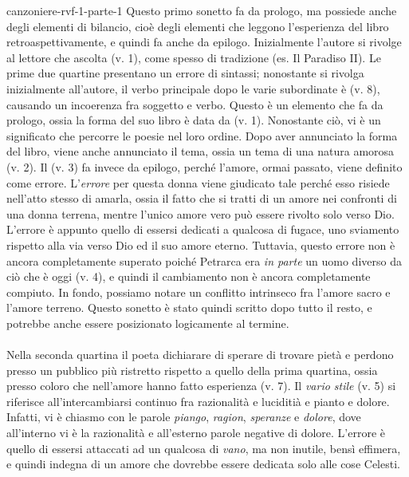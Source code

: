 \documentclass[preview]{standalone}
\begin{document}
\begin{snippet}{canzoniere-rvf-1-parte-1}
    Questo primo sonetto fa da prologo, ma possiede anche degli elementi di bilancio,
    cioè degli elementi che leggono l'esperienza del libro retroaspettivamente,
    e quindi fa anche da epilogo.
    Inizialmente l'autore si rivolge al lettore che ascolta (v. 1), come spesso di tradizione (es. Il Paradiso II).
    Le prime due quartine presentano un errore di sintassi; nonostante si rivolga inizialmente all'autore,
    il verbo principale dopo le varie subordinate è  (v. 8), causando un incoerenza fra soggetto e verbo.
    Questo è un elemento che fa da prologo, ossia la forma del suo libro è data da  (v. 1).
    Nonostante ciò, vi è un significato che percorre le poesie nel loro ordine.
    Dopo aver annunciato la forma del libro, viene anche annunciato il tema, ossia
    un tema di una natura amorosa (v. 2).
    Il (v. 3) fa invece da epilogo, perché l'amore, ormai passato, viene definito come errore.
    L'\textit{errore} per questa donna viene giudicato tale perché esso risiede nell'atto stesso di amarla,
    ossia il fatto che si tratti di un amore nei confronti di una donna terrena, mentre l'unico amore
    vero può essere rivolto solo verso Dio. L'errore è appunto quello di essersi dedicati a qualcosa di fugace,
    uno sviamento rispetto alla via verso Dio ed il suo amore eterno.
    Tuttavia, questo errore non è ancora completamente superato poiché Petrarca
    era \textit{in parte} un uomo diverso da ciò che è oggi (v. 4), e quindi il cambiamento non è ancora
    completamente compiuto.
    In fondo, possiamo notare un conflitto intrinseco fra l'amore sacro e l'amore terreno.
    Questo sonetto è stato quindi scritto dopo tutto il resto, e potrebbe anche essere posizionato
    logicamente al termine.
    \\\\
    Nella seconda quartina il poeta dichiarare di sperare di trovare pietà e perdono
    presso un pubblico più ristretto rispetto a quello della prima quartina,
    ossia presso coloro che nell'amore hanno fatto esperienza (v. 7).
    Il \textit{vario stile} (v. 5) si riferisce all'intercambiarsi continuo fra
    razionalità e luciditià e pianto e dolore. Infatti, vi è chiasmo con le parole \textit{piango},
    \textit{ragion}, \textit{speranze} e \textit{dolore}, dove all'interno vi è la razionalità e all'esterno
    parole negative di dolore.
    L'errore è quello di essersi attaccati ad un qualcosa di \textit{vano}, ma non inutile, bensì effimera, e quindi
    indegna di un amore che dovrebbe essere dedicata solo alle cose Celesti.

\end{snippet}
\end{document}
